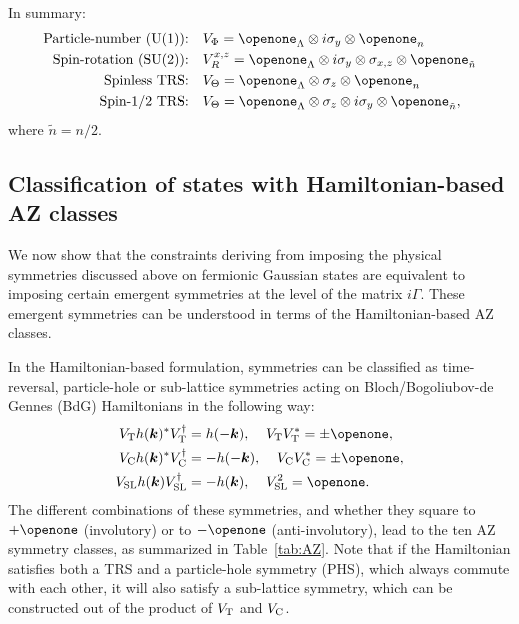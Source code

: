\documentclass[prl,twocolumn,preprintnumbers,superscriptaddress,amsmath,amssymb]{revtex4-1}
\begin{document}
In summary:
\begin{align}
    \mbox{Particle-number (U(1)):}& \quad V_\Phi = \openone_\Lambda \otimes i\sigma_y\otimes\openone_n  \nonumber\\
    \mbox{Spin-rotation (SU(2)):}& \quad V_R^{x,z} = \openone_\Lambda \otimes i\sigma_y\otimes \sigma_{x,z} \otimes\openone_{\tilde n} \nonumber\\
    \mbox{Spinless TRS:}& \quad V_\Theta = \openone_\Lambda\otimes\sigma_z \otimes\openone_n \nonumber\\
    \mbox{Spin-$1/2$ TRS:}& \quad V_\Theta = \openone_\Lambda\otimes \sigma_z\otimes i\sigma_y \otimes\openone_{\tilde n} \nonumber,
\end{align}
where $\tilde n= n/2$. 





\subsection{Classification of states with Hamiltonian-based AZ classes}

We now show that the constraints deriving from imposing the physical symmetries discussed above on fermionic Gaussian states are equivalent to imposing certain emergent symmetries at the level of the matrix $i\Gamma$. These emergent symmetries can be understood in terms of the Hamiltonian-based AZ classes.

In the Hamiltonian-based formulation, symmetries can be classified as time-reversal, particle-hole or sub-lattice symmetries acting on Bloch/Bogoliubov-de Gennes (BdG) Hamiltonians in the following way:
\begin{equation}
\begin{split}
V_{\rm T} h(\boldsymbol{k})^* V_{\rm T}^\dag &= h(-\boldsymbol{k}),\;\;\;\; V_{\rm T}V_{\rm T}^*=\pm\openone,  \\
V_{\rm C} h(\boldsymbol{k})^* V_{\rm C}^\dag &= -h(-\boldsymbol{k}),\;\;\;\; V_{\rm C}V_{\rm C}^*=\pm\openone, \\
V_{\rm SL} h(\boldsymbol{k}) V_{\rm SL}^\dag &= -h(\boldsymbol{k}),\;\;\;\;V_{\rm SL}^2=\openone.
\end{split}
\label{TCSL}
\end{equation}
The different combinations of these symmetries, and whether they square to $+\openone$ (involutory) or to $-\openone$ (anti-involutory), lead to the ten AZ symmetry classes, as summarized in Table~\ref{tab:AZ}. Note that if the Hamiltonian satisfies both a TRS and a particle-hole symmetry (PHS), which always commute with each other, it will also satisfy a sub-lattice symmetry, which can be constructed out of the product of $V_{\rm T}$ and $V_{\rm C}$.
\end{document}
